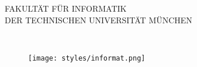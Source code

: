 






\thispagestyle{empty}

\vspace{4cm}
\begin{center}
  \oTUM{4cm}

  \vspace{5mm}
  \huge FAKULT{\"A}T F{\"U}R INFORMATIK\\
  \vspace{0.5cm}
  \large DER TECHNISCHEN UNIVERSIT{\"A}T M{\"U}NCHEN\\
  \vspace{1mm}

\end{center}


\vspace{15mm}
\begin{center}

  {\Large \thedoctype}

  \vspace{20mm}

  {\huge\bf \thetitle}\\%


  \vspace{15mm}


  {\LARGE  \theauthor}



  \vspace{5mm}



  \begin{figure}[h!]
    \centering
    \texttt{[image: styles/informat.png]}
  \end{figure}


\end{center}
